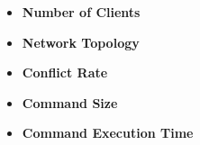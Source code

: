 \begin{itemize}
  \item \textbf{Number of Clients}
  \item \textbf{Network Topology}
  \item \textbf{Conflict Rate}
  \item \textbf{Command Size}
  \item \textbf{Command Execution Time}
\end{itemize}
